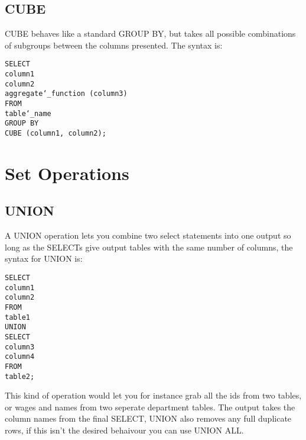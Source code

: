 \documentclass[10pt, english]{article}
\begin{document}
\subsection{CUBE}
CUBE behaves like a standard GROUP BY, but takes all possible combinations of subgroups between 
the columns presented. The syntax is:

\texttt{SELECT\\
\hspace*{10pt} column1 \\
\hspace*{10pt} column2 \\
\hspace*{10pt} aggregate\char`_function (column3) \\
FROM \\
\hspace*{10pt} table\char`_name\\
GROUP BY\\
\hspace*{10pt} CUBE (column1, column2);
}

\newpage
\section{Set Operations}
\subsection{UNION}
A UNION operation lets you combine two select statements into one output so long as the SELECTs give output tables with the same number of columns, the syntax for UNION is:

\texttt{SELECT\\
\hspace*{10pt} column1 \\
\hspace*{10pt} column2 \\
FROM \\
\hspace*{10pt} table1\\
UNION \\
SELECT \\
\hspace*{10pt} column3 \\
\hspace*{10pt} column4 \\
FROM \\
\hspace*{10pt} table2;
}

This kind of operation would let you for instance grab all the ids from two tables, or wages and names from two seperate department tables. The output takes the column names from the final SELECT, UNION also removes
any full duplicate rows, if this isn't the desired behaivour you can use UNION ALL.
\end{document}
